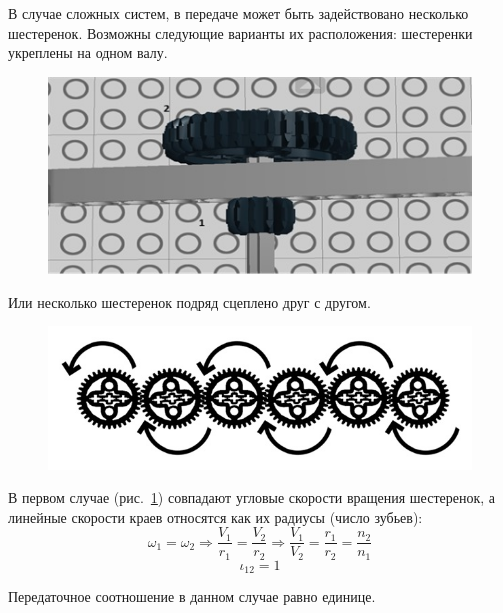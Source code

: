 В случае сложных систем, в передаче может быть задействовано несколько шестеренок. Возможны следующие варианты их расположения: шестеренки укреплены на одном валу.
\clearpage
\begin{figure}[h!]
	\begin{center}
		\includegraphics[width=1\linewidth]{chapters/chapter6/images/2}
		\caption{}
		\label{ris:image6x2}
	\end{center}
\end{figure}	

Или несколько шестеренок подряд сцеплено друг с другом.
\begin{figure}[h!]
	\begin{center}
		\includegraphics[width=1\linewidth]{chapters/chapter6/images/3}
		\caption{}
		\label{ris:image6x3}
	\end{center}
\end{figure}	

В первом случае (рис.~\ref{ris:image6x2}) совпадают угловые скорости вращения шестеренок, а линейные скорости краев относятся как их радиусы (число зубьев):
\begin{equation}
\omega_1=\omega_2\Rightarrow\frac{V_1}{r_1}=\frac{V_2}{r_2}\Rightarrow\frac{V_1}{V_2}=\frac{r_1}{r_2}=\frac{n_2}{n_1}
\end{equation}
\begin{equation}
\iota_{12}=1
\end{equation}

Передаточное соотношение в данном случае равно единице.


